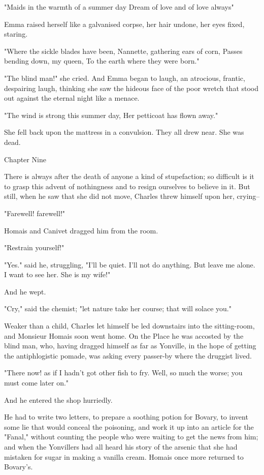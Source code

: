 \documentclass[11pt,twocolumn]{ltugboat}
\begin{document}
"Maids in the warmth of a summer day Dream of love and of love always"

Emma raised herself like a galvanised corpse, her hair undone, her eyes
fixed, staring.

"Where the sickle blades have been, Nannette, gathering ears of corn,
Passes bending down, my queen, To the earth where they were born."

"The blind man!" she cried. And Emma began to laugh, an atrocious,
frantic, despairing laugh, thinking she saw the hideous face of the poor
wretch that stood out against the eternal night like a menace.

"The wind is strong this summer day, Her petticoat has flown away."

She fell back upon the mattress in a convulsion. They all drew near. She
was dead.



Chapter Nine

There is always after the death of anyone a kind of stupefaction;
so difficult is it to grasp this advent of nothingness and to resign
ourselves to believe in it. But still, when he saw that she did not
move, Charles threw himself upon her, crying--

"Farewell! farewell!"

Homais and Canivet dragged him from the room.

"Restrain yourself!"

"Yes." said he, struggling, "I'll be quiet. I'll not do anything. But
leave me alone. I want to see her. She is my wife!"

And he wept.

"Cry," said the chemist; "let nature take her course; that will solace
you."

Weaker than a child, Charles let himself be led downstairs into the
sitting-room, and Monsieur Homais soon went home. On the Place he
was accosted by the blind man, who, having dragged himself as far as
Yonville, in the hope of getting the antiphlogistic pomade, was asking
every passer-by where the druggist lived.

"There now! as if I hadn't got other fish to fry. Well, so much the
worse; you must come later on."

And he entered the shop hurriedly.

He had to write two letters, to prepare a soothing potion for Bovary, to
invent some lie that would conceal the poisoning, and work it up into an
article for the "Fanal," without counting the people who were waiting to
get the news from him; and when the Yonvillers had all heard his story
of the arsenic that she had mistaken for sugar in making a vanilla
cream. Homais once more returned to Bovary's.
\end{document}
